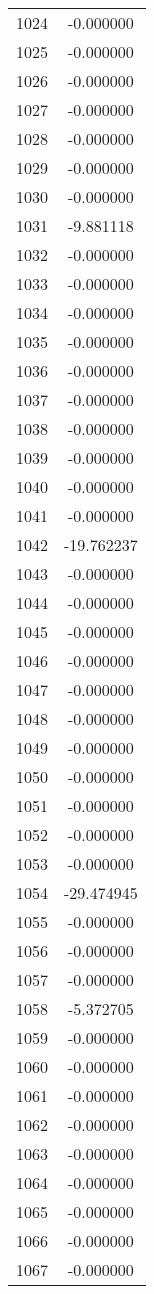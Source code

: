 \documentclass[12pt]{article}
\begin{document}
\begin{longtable}{@{}cc@{}}
1024 & -0.000000 \\
1025 & -0.000000 \\
1026 & -0.000000 \\
1027 & -0.000000 \\
1028 & -0.000000 \\
1029 & -0.000000 \\
1030 & -0.000000 \\
1031 & -9.881118 \\
1032 & -0.000000 \\
1033 & -0.000000 \\
1034 & -0.000000 \\
1035 & -0.000000 \\
1036 & -0.000000 \\
1037 & -0.000000 \\
1038 & -0.000000 \\
1039 & -0.000000 \\
1040 & -0.000000 \\
1041 & -0.000000 \\
1042 & -19.762237 \\
1043 & -0.000000 \\
1044 & -0.000000 \\
1045 & -0.000000 \\
1046 & -0.000000 \\
1047 & -0.000000 \\
1048 & -0.000000 \\
1049 & -0.000000 \\
1050 & -0.000000 \\
1051 & -0.000000 \\
1052 & -0.000000 \\
1053 & -0.000000 \\
1054 & -29.474945 \\
1055 & -0.000000 \\
1056 & -0.000000 \\
1057 & -0.000000 \\
1058 & -5.372705 \\
1059 & -0.000000 \\
1060 & -0.000000 \\
1061 & -0.000000 \\
1062 & -0.000000 \\
1063 & -0.000000 \\
1064 & -0.000000 \\
1065 & -0.000000 \\
1066 & -0.000000 \\
1067 & -0.000000 \\

\end{longtable}
\end{document}
